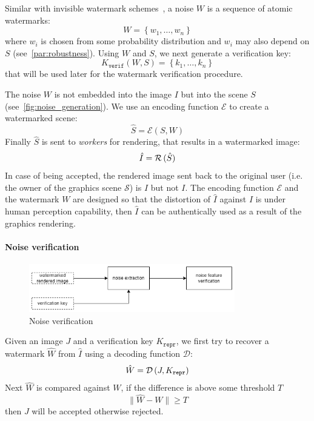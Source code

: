 Similar with invisible watermark schemes~\cite{Yeung1997,Craver1997,Wu1998}, a noise $W$ is a sequence of atomic watermarks:
\begin{equation*}
    W = \left\{ w_1,\dots,w_n \right\}
\end{equation*}
where $w_i$ is chosen from some probability distribution and $w_i$ may also depend on $S$ (see~\autoref{par:robustness}). Using $W$ and $S$, we next generate a verification key:
\begin{equation*}
    K_{\mathtt{verif}} \left(W,S\right) = \left\{ k_1,\dots,k_n \right\}
\end{equation*}
that will be used later for the watermark verification procedure.

The noise $W$ is not embedded into the image $I$ but into the scene $S$ (see~\autoref{fig:noise_generation}). We use an encoding function $\mathcal{E}$ to create a watermarked scene:
\begin{equation*}
    \hat{S} = \mathcal{E} \left(S, W\right)
\end{equation*}
Finally $\hat{S}$ is sent to \emph{workers} for rendering, that results in a watermarked image:
\begin{equation*}
    \hat{I} = \mathcal{R} \thinspace (\hat{S})
\end{equation*}
In case of being accepted, the rendered image sent back to the original user (i.e. the owner of the graphics scene $\mathcal{S}$) is $\hat{I}$ but not $I$. The encoding function $\mathcal{E}$ and the watermark $W$ are designed so that the distortion of $\hat{I}$ against $I$ is under human perception capability, then $\hat{I}$ can be authentically used as a result of the graphics rendering.

\paragraph[Noise verification]{Noise verification}
\begin{figure}[h]
    \centering
    \includegraphics[width=0.8\textwidth]{noise_verification.png}
    \caption[Noise verification]{Noise verification}
    \label{fig:noise_verification}
\end{figure}
Given an image $J$ and a verification key $K_{\mathtt{repr}}$, we first try to recover a watermark $\hat{W}$ from $\hat{I}$ using a decoding function $\mathcal{D}$:
\begin{equation*}
    \hat{W} = \mathcal{D} \thinspace (J, K_{\mathtt{repr}})
\end{equation*}
Next $\hat{W}$ is compared against $W$, if the difference is above some threshold $T$
\begin{equation*}
    \lVert \hat{W} - W \rVert \geq T
\end{equation*}
then $J$ will be accepted otherwise rejected.

